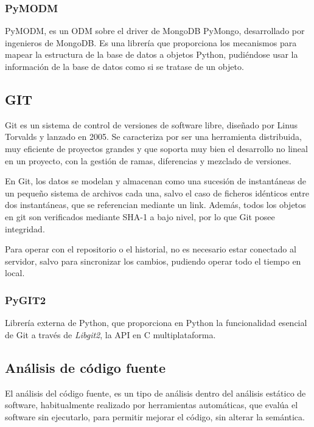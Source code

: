 \subsubsection{PyMODM} 
\label{sec:pymod}

PyMODM, es un ODM sobre el driver de MongoDB PyMongo, desarrollado por ingenieros de MongoDB. Es una librería que proporciona los mecanismos para mapear la estructura de la base de datos a objetos Python, pudiéndose usar la información de la base de datos como si se tratase de un objeto.


\subsection{GIT} 
\label{sec:git}

Git es un sistema de control de versiones de software libre, diseñado por Linus Torvalds y lanzado en 2005. Se caracteriza por ser una herramienta distribuida, muy eficiente de proyectos grandes y que soporta muy bien el desarrollo no lineal en un proyecto, con la gestión de ramas, diferencias y mezclado de versiones.


En Git, los datos se modelan y almacenan como una sucesión de instantáneas de un pequeño sistema de archivos cada una, salvo el caso de ficheros idénticos entre dos instantáneas, que se referencian mediante un link. Además, todos los objetos en git son verificados mediante SHA-1 a bajo nivel, por lo que Git posee integridad.


Para operar con el repositorio o el historial, no es necesario  estar conectado al servidor, salvo para sincronizar los cambios, pudiendo operar todo el tiempo en local.


\subsubsection{PyGIT2} 
\label{sec:pygit2}

Librería externa de Python, que proporciona en Python la funcionalidad esencial de Git a través de \textit{Libgit2}, la API en C multiplataforma.

\subsection{Análisis de código fuente} 
\label{sec:anal_cod}

El análisis del código fuente, es un tipo de análisis dentro del análisis estático de software, habitualmente realizado por herramientas automáticas, que evalúa el software sin ejecutarlo, para permitir mejorar el código, sin alterar la semántica.


